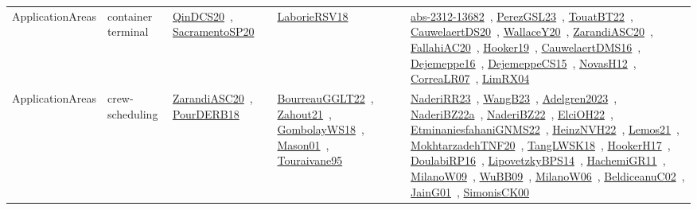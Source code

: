{\begin{longtable}{lp{3cm}>{\raggedright\arraybackslash}p{6cm}>{\raggedright\arraybackslash}p{6cm}>{\raggedright\arraybackslash}p{8cm}}
ApplicationAreas & container terminal & \href{../works/QinDCS20.pdf}{QinDCS20}~\cite{QinDCS20}, \href{../works/SacramentoSP20.pdf}{SacramentoSP20}~\cite{SacramentoSP20} & \href{../works/LaborieRSV18.pdf}{LaborieRSV18}~\cite{LaborieRSV18} & \href{../works/abs-2312-13682.pdf}{abs-2312-13682}~\cite{abs-2312-13682}, \href{../works/PerezGSL23.pdf}{PerezGSL23}~\cite{PerezGSL23}, \href{../works/TouatBT22.pdf}{TouatBT22}~\cite{TouatBT22}, \href{../works/CauwelaertDS20.pdf}{CauwelaertDS20}~\cite{CauwelaertDS20}, \href{../works/WallaceY20.pdf}{WallaceY20}~\cite{WallaceY20}, \href{../works/ZarandiASC20.pdf}{ZarandiASC20}~\cite{ZarandiASC20}, \href{../works/FallahiAC20.pdf}{FallahiAC20}~\cite{FallahiAC20}, \href{../works/Hooker19.pdf}{Hooker19}~\cite{Hooker19}, \href{../works/CauwelaertDMS16.pdf}{CauwelaertDMS16}~\cite{CauwelaertDMS16}, \href{../works/Dejemeppe16.pdf}{Dejemeppe16}~\cite{Dejemeppe16}, \href{../works/DejemeppeCS15.pdf}{DejemeppeCS15}~\cite{DejemeppeCS15}, \href{../works/NovasH12.pdf}{NovasH12}~\cite{NovasH12}, \href{../works/CorreaLR07.pdf}{CorreaLR07}~\cite{CorreaLR07}, \href{../works/LimRX04.pdf}{LimRX04}~\cite{LimRX04}\\
ApplicationAreas & crew-scheduling & \href{../works/ZarandiASC20.pdf}{ZarandiASC20}~\cite{ZarandiASC20}, \href{../works/PourDERB18.pdf}{PourDERB18}~\cite{PourDERB18} & \href{../works/BourreauGGLT22.pdf}{BourreauGGLT22}~\cite{BourreauGGLT22}, \href{../works/Zahout21.pdf}{Zahout21}~\cite{Zahout21}, \href{../works/GombolayWS18.pdf}{GombolayWS18}~\cite{GombolayWS18}, \href{../works/Mason01.pdf}{Mason01}~\cite{Mason01}, \href{../works/Touraivane95.pdf}{Touraivane95}~\cite{Touraivane95} & \href{../works/NaderiRR23.pdf}{NaderiRR23}~\cite{NaderiRR23}, \href{../works/WangB23.pdf}{WangB23}~\cite{WangB23}, \href{../works/Adelgren2023.pdf}{Adelgren2023}~\cite{Adelgren2023}, \href{../works/NaderiBZ22a.pdf}{NaderiBZ22a}~\cite{NaderiBZ22a}, \href{../works/NaderiBZ22.pdf}{NaderiBZ22}~\cite{NaderiBZ22}, \href{../works/ElciOH22.pdf}{ElciOH22}~\cite{ElciOH22}, \href{../works/EtminaniesfahaniGNMS22.pdf}{EtminaniesfahaniGNMS22}~\cite{EtminaniesfahaniGNMS22}, \href{../works/HeinzNVH22.pdf}{HeinzNVH22}~\cite{HeinzNVH22}, \href{../works/Lemos21.pdf}{Lemos21}~\cite{Lemos21}, \href{../works/MokhtarzadehTNF20.pdf}{MokhtarzadehTNF20}~\cite{MokhtarzadehTNF20}, \href{../works/TangLWSK18.pdf}{TangLWSK18}~\cite{TangLWSK18}, \href{../works/HookerH17.pdf}{HookerH17}~\cite{HookerH17}, \href{../works/DoulabiRP16.pdf}{DoulabiRP16}~\cite{DoulabiRP16}, \href{../works/LipovetzkyBPS14.pdf}{LipovetzkyBPS14}~\cite{LipovetzkyBPS14}, \href{../works/HachemiGR11.pdf}{HachemiGR11}~\cite{HachemiGR11}, \href{../works/MilanoW09.pdf}{MilanoW09}~\cite{MilanoW09}, \href{../works/WuBB09.pdf}{WuBB09}~\cite{WuBB09}, \href{../works/MilanoW06.pdf}{MilanoW06}~\cite{MilanoW06}, \href{../works/BeldiceanuC02.pdf}{BeldiceanuC02}~\cite{BeldiceanuC02}, \href{../works/JainG01.pdf}{JainG01}~\cite{JainG01}, \href{../works/SimonisCK00.pdf}{SimonisCK00}~\cite{SimonisCK00}\\

\end{longtable}}
